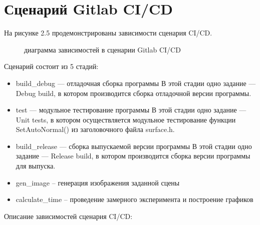 \documentclass[a4paper,14pt]{extreport}
\begin{document}
	\section{Сценарий Gitlab CI/CD}
	На рисунке 2.5 продемонстрированы зависимости сценария CI/CD.
	\begin{figure}[H]
		\caption{диаграмма зависимостей в сценарии Gitlab CI/CD}
		\label{ris:image}
	\end{figure}
\par Сценарий состоит из 5 стадий:
\begin{itemize}
\item build\_debug — отладочная сборка программы
В этой стадии одно задание — Debug build, в котором производится 
сборка отладочной версии программы.
\item test — модульное тестирование программы
В этой стадии одно задание — Unit tests, в котором осуществляется 
модульное тестирование функции SetAutoNormal() из заголовочного файла 
surface.h.
\item build\_release — сборка выпускаемой версии программы
В этой стадии одно задание — Release build, в котором производится 
сборка версии программы для выпуска.
\item gen\_image --  генерация изображения заданной сцены
\item calculate\_time -- проведение замерного эксперимента и построение графиков
\end{itemize}
\par Описание зависимостей сценария CI/CD:
\end{document}
